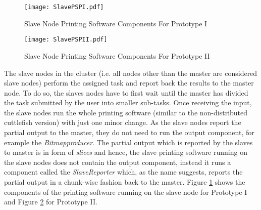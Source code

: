 \begin{figure}[t]
\centering
\texttt{[image: SlavePSPI.pdf]}
\caption{Slave Node Printing Software Components For Prototype I }
\label{fig:SlavePS}
\end{figure}

\begin{figure}[t]
\centering
\texttt{[image: SlavePSPII.pdf]}
\caption{Slave Node Printing Software Components For Prototype II }
\label{fig:SlavePSII}
\end{figure}

The slave nodes in the cluster (i.e. all nodes other than the master are considered slave nodes) perform the assigned task and report back the results to the master node. To do so, the slaves nodes have to first wait until the master has divided the task submitted by the user into smaller sub-tasks. Once receiving the input, the slave nodes run the whole printing software (similar to the non-distributed cuttlefish version) with just one minor change. As the slave nodes report the partial output to the master, they do not need to run the output component, for example the \textit{Bitmapproducer}. The partial output which is reported by the slaves to master is in form of \textit{slices} and hence, the slave printing software running on the slave nodes does not contain the output component, instead it runs a component called the \textit{SlaveReporter} which, as the name suggests, reports the partial output in a chunk-wise fashion back to the master. Figure \ref{fig:SlavePS} shows the components of the printing software running on the slave node for Prototype I and Figure \ref{fig:SlavePSII} for Prototype II.

\clearpage
